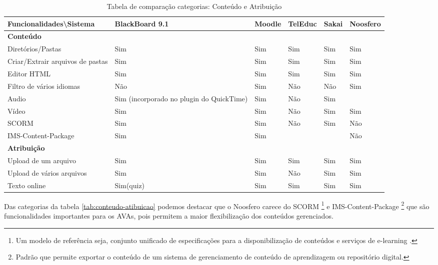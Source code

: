 \begin{table}[h]
\begin{center}
\begin{tabular}{@{}p{5cm}|p{3.5cm}|p{3.5cm}|p{2.5cm}|p{2.5cm}|p{3.5cm}@{}}
\toprule
\textbf{Funcionalidades\textbackslash Sistema} & \textbf{BlackBoard 9.1} & \textbf{Moodle} & \textbf{TelEduc} & \textbf{Sakai} & \textbf{Noosfero}\\ \midrule
\textbf{Conteúdo} &  &  &  &  &  \\
Diretórios/Pastas & Sim & Sim & Sim & Sim & Sim \\
Criar/Extrair arquivos de pastas & Sim & Sim & Sim & Sim & Sim \\
Editor HTML & Sim & Sim & Sim & Sim & Sim \\
Filtro de vários idiomas & Não & Sim & Não & Não & Sim \\
Audio & Sim (incorporado no plugin do QuickTime) & Sim & Não & Sim &  \\
Vídeo & Sim & Sim & Não & Sim & Sim \\
SCORM & Sim & Sim & Não & Sim & Não \\
IMS-Content-Package & Sim & Sim &  &  & Não \\
\textbf{Atribuição} &  &  &  &  &  \\
Upload de um arquivo & Sim & Sim & Sim & Sim & Sim \\
Upload de vários arquivos & Sim & Sim & Não & Sim & Sim \\
Texto online & Sim(quiz) & Sim & Sim & Sim & Sim
\end{tabular}
\caption{Tabela de comparação categorias: Conteúdo e Atribuição}
\label{tab:conteudo-atribuicao}
\end{center}
\end{table}

Das categorias da tabela \ref{tab:conteudo-atibuicao} podemos destacar que o Noosfero carece do SCORM \footnote{Um modelo de referência seja, conjunto unificado de especificações para a disponibilização de conteúdos e serviços de e-learning \cite{de2006objetos}.} e IMS-Content-Package \footnote{Padrão que permite exportar o conteúdo de um sistema de gerenciamento de conteúdo de aprendizagem ou repositório digital.} que são funcionalidades importantes para os AVAs, pois permitem a maior flexibilização dos conteúdos gerenciados.

